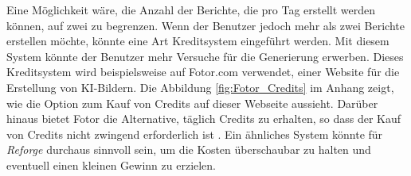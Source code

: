 Eine Möglichkeit wäre, die Anzahl der Berichte, die pro Tag erstellt werden können, auf zwei zu begrenzen. Wenn der Benutzer jedoch mehr als zwei Berichte erstellen möchte, könnte eine Art Kreditsystem eingeführt werden. Mit diesem System könnte der Benutzer mehr Versuche für die Generierung erwerben. Dieses Kreditsystem wird beispielsweise auf Fotor.com verwendet, einer Website für die Erstellung von \ac{KI}-Bildern. Die Abbildung \ref{fig:Fotor_Credits} im Anhang zeigt, wie die Option zum Kauf von Credits auf dieser Webseite aussieht. Darüber hinaus bietet Fotor die Alternative, täglich Credits zu erhalten, so dass der Kauf von Credits nicht zwingend erforderlich ist \cite{fotor}. Ein ähnliches System könnte für \textit{Reforge} durchaus sinnvoll sein, um die Kosten überschaubar zu halten und eventuell einen kleinen Gewinn zu erzielen.
